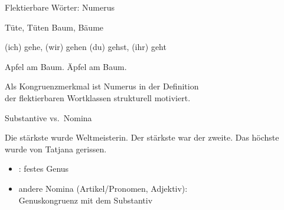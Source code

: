 \begin{frame}
  {Flektierbare Wörter: Numerus}
  \pause
  \begin{exe}
    \ex
    \begin{xlist}
      \ex Tüte, Tüten
      \pause
      \ex Baum, Bäume
    \end{xlist}
    \pause
    \ex
    \begin{xlist}
      \ex (ich) gehe, (wir) gehen
      \pause
      \ex (du) gehst, (ihr) geht
    \end{xlist}
    \Zeile
    \pause
    \ex
    \begin{xlist}
      \ex {}  \alert<8->{Apfel}  am Baum.
      \pause
      \ex {} \alert<10->{Äpfel}  am Baum.
    \end{xlist}
  \end{exe}
  \Zeile
  \pause
  \pause
  \pause
  \pause
  \pause
  \pause
  \pause
  \pause
  Als \alert{Kongruenzmerkmal} ist Numerus in der Definition\\
  der flektierbaren Wortklassen \alert{strukturell motiviert}.
\end{frame}

\begin{frame}
  {Substantive vs.\ Nomina}
  \pause
  \begin{exe}
    \ex \alert<5->{Die stärkste}  wurde Weltmeisterin.
    \pause
    \ex \alert<5->{Der stärkste}  war der zweite.
    \pause
    \ex \alert<5->{Das höchste}  wurde von Tatjana gerissen.
  \end{exe}
  \Zeile
  \pause
  \pause
  \begin{itemize}[<+->]
    \item {}: festes Genus
    \item \alert{andere Nomina} (Artikel\slash Pronomen, Adjektiv):\\
      Genuskongruenz mit dem Substantiv
  \end{itemize}
\end{frame}

